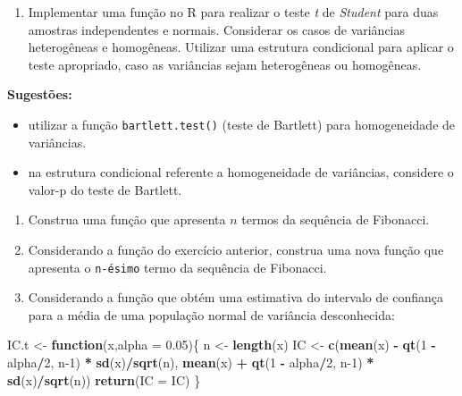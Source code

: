 \documentclass[
]{article}
\newenvironment{Shaded}{\begin{snugshade}}{\end{snugshade}}
\newcommand{\AttributeTok}[1]{\textcolor[rgb]{0.13,0.29,0.53}{#1}}
\newcommand{\ControlFlowTok}[1]{\textcolor[rgb]{0.13,0.29,0.53}{\textbf{#1}}}
\newcommand{\DecValTok}[1]{\textcolor[rgb]{0.00,0.00,0.81}{#1}}
\newcommand{\FloatTok}[1]{\textcolor[rgb]{0.00,0.00,0.81}{#1}}
\newcommand{\FunctionTok}[1]{\textcolor[rgb]{0.13,0.29,0.53}{\textbf{#1}}}
\newcommand{\NormalTok}[1]{#1}
\newcommand{\OtherTok}[1]{\textcolor[rgb]{0.56,0.35,0.01}{#1}}
\newcommand{\SpecialCharTok}[1]{\textcolor[rgb]{0.81,0.36,0.00}{\textbf{#1}}}
\providecommand{\tightlist}{%
  \setlength{\itemsep}{0pt}\setlength{\parskip}{0pt}}
\begin{document}
\begin{enumerate}
\def\labelenumi{\arabic{enumi}.}
\setcounter{enumi}{35}
\tightlist
\item
  Implementar uma função no R para realizar o teste \emph{t} de
  \emph{Student} para duas amostras independentes e normais. Considerar
  os casos de variâncias heterogêneas e homogêneas. Utilizar uma
  estrutura condicional para aplicar o teste apropriado, caso as
  variâncias sejam heterogêneas ou homogêneas.
\end{enumerate}

\textbf{Sugestões:}

\begin{itemize}
\tightlist
\item
  utilizar a função \texttt{bartlett.test()} (teste de Bartlett) para
  homogeneidade de variâncias.
\item
  na estrutura condicional referente a homogeneidade de variâncias,
  considere o valor-p do teste de Bartlett.
\end{itemize}

\begin{enumerate}
\def\labelenumi{\arabic{enumi}.}
\setcounter{enumi}{36}
\item
  Construa uma função que apresenta \(n\) termos da sequência de
  Fibonacci.
\item
  Considerando a função do exercício anterior, construa uma nova função
  que apresenta o \texttt{n-ésimo} termo da sequência de Fibonacci.
\item
  Considerando a função que obtém uma estimativa do intervalo de
  confiança para a média de uma população normal de variância
  desconhecida:
\end{enumerate}

\begin{Shaded}
\begin{Highlighting}[]
\NormalTok{IC.t }\OtherTok{\textless{}{-}} \ControlFlowTok{function}\NormalTok{(x,}\AttributeTok{alpha =} \FloatTok{0.05}\NormalTok{)\{}
\NormalTok{  n }\OtherTok{\textless{}{-}} \FunctionTok{length}\NormalTok{(x)}
\NormalTok{  IC }\OtherTok{\textless{}{-}} \FunctionTok{c}\NormalTok{(}\FunctionTok{mean}\NormalTok{(x) }\SpecialCharTok{{-}} \FunctionTok{qt}\NormalTok{(}\DecValTok{1} \SpecialCharTok{{-}}\NormalTok{ alpha}\SpecialCharTok{/}\DecValTok{2}\NormalTok{, n}\DecValTok{{-}1}\NormalTok{) }\SpecialCharTok{*} \FunctionTok{sd}\NormalTok{(x)}\SpecialCharTok{/}\FunctionTok{sqrt}\NormalTok{(n),}
\FunctionTok{mean}\NormalTok{(x) }\SpecialCharTok{+} \FunctionTok{qt}\NormalTok{(}\DecValTok{1} \SpecialCharTok{{-}}\NormalTok{ alpha}\SpecialCharTok{/}\DecValTok{2}\NormalTok{, n}\DecValTok{{-}1}\NormalTok{) }\SpecialCharTok{*} \FunctionTok{sd}\NormalTok{(x)}\SpecialCharTok{/}\FunctionTok{sqrt}\NormalTok{(n))}
  \FunctionTok{return}\NormalTok{(}\AttributeTok{IC =}\NormalTok{ IC)}
\NormalTok{\}}
\end{Highlighting}
\end{Shaded}
\end{document}
